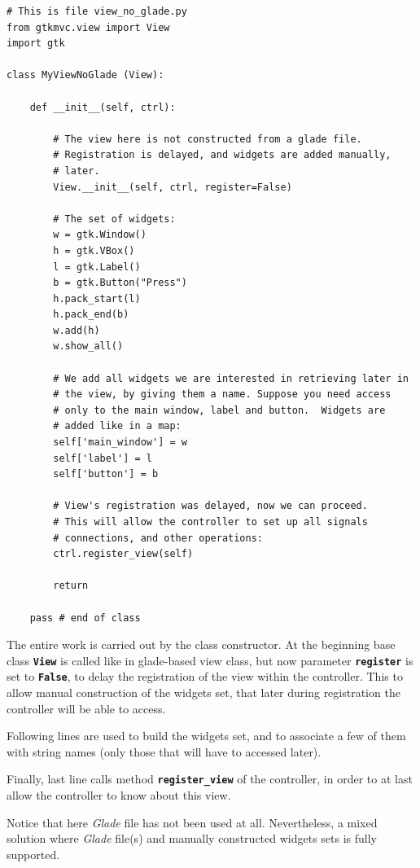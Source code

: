 \documentclass{article}
\newcommand{\appl}[1]{\textsl{#1}\xspace}
\newcommand{\glade}{\appl{Glade}}
\newcommand{\codename}[1]{\texttt{\bfseries \textcolor {codecolor}{#1}}\xspace}
\newcommand{\codesize}{\small } %
\begin{document}
{ \codesize 
\begin{verbatim}   
# This is file view_no_glade.py
from gtkmvc.view import View
import gtk

class MyViewNoGlade (View):

    def __init__(self, ctrl):

        # The view here is not constructed from a glade file.
        # Registration is delayed, and widgets are added manually,
        # later.
        View.__init__(self, ctrl, register=False)
    
        # The set of widgets:
        w = gtk.Window()
        h = gtk.VBox()
        l = gtk.Label()
        b = gtk.Button("Press")
        h.pack_start(l)
        h.pack_end(b)
        w.add(h)
        w.show_all()

        # We add all widgets we are interested in retrieving later in
        # the view, by giving them a name. Suppose you need access
        # only to the main window, label and button.  Widgets are
        # added like in a map:
        self['main_window'] = w
        self['label'] = l
        self['button'] = b
        
        # View's registration was delayed, now we can proceed.
        # This will allow the controller to set up all signals
        # connections, and other operations:
        ctrl.register_view(self)

        return

    pass # end of class
\end{verbatim}
} 

The entire work is carried out by the class constructor. At the
beginning base class \codename{View} is called like in glade-based
view class, but now parameter \codename{register} is set to
\codename{False}, to delay the registration of the view within the
controller. This to allow manual construction of the widgets set, that
later during registration the controller will be able to access.

Following lines are used to build the widgets set, and to associate a
few of them with string names (only those that will have to accessed
later).

Finally, last line calls method \codename{register\_view} of the
controller, in order to at last allow the controller to know about
this view.

Notice that here \glade file has not been used at all. Nevertheless, a
mixed solution where \glade file(s) and manually constructed widgets
sets is fully supported.
\end{document}

